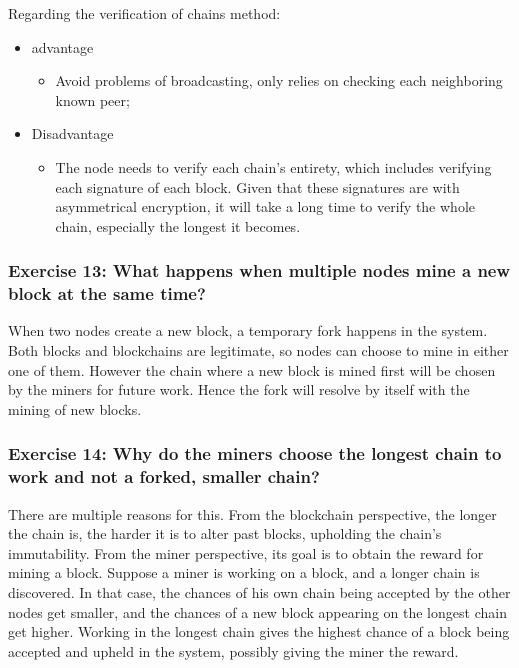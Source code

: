 \documentclass[12pt,a4paper]{article}
\begin{document}
Regarding the verification of chains method:
\begin{itemize}
\item advantage
\begin{itemize}
\item Avoid problems of broadcasting, only relies on checking each neighboring known peer;
\end{itemize}
\item Disadvantage
\begin{itemize}
\item The node needs to verify each chain's entirety, which includes verifying each signature of each block. Given that these signatures are with asymmetrical encryption, it will take a long time to verify the whole chain, especially the longest it becomes.
\end{itemize}
\end{itemize}

\subsubsection*{Exercise 13: What happens when multiple nodes mine a new block at the same time?}

When two nodes create a new block, a temporary fork happens in the system. Both blocks and blockchains are legitimate, so nodes can choose to mine in either one of them. However the chain where a new block is mined first will be chosen by the miners for future work. Hence the fork will resolve by itself with the mining of new blocks.

\subsubsection*{Exercise 14: Why do the miners choose the longest chain to work and not a forked, smaller chain?}

There are multiple reasons for this. From the blockchain perspective, the longer the chain is, the harder it is to alter past blocks, upholding the chain's immutability. From the miner perspective, its goal is to obtain the reward for mining a block. Suppose a miner is working on a block, and a longer chain is discovered. In that case, the chances of his own chain being accepted by the other nodes get smaller, and the chances of a new block appearing on the longest chain get higher. Working in the longest chain gives the highest chance of a block being accepted and upheld in the system, possibly giving the miner the reward.
\end{document}
